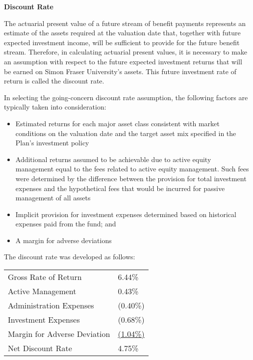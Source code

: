 \documentclass{report}
\begin{document}
\vspace{3mm}
\textbf{Discount Rate}

The actuarial present value of a future stream of benefit payments represents an estimate of the assets required at the valuation date that, together with future expected investment income, will be sufficient to provide for the future benefit stream. Therefore, in calculating actuarial present values, it is necessary to make an assumption with respect to the future expected investment returns that will be earned on Simon Fraser University's assets. This future investment rate of return is called the discount rate.

\vspace{3mm}
In selecting the going-concern discount rate assumption, the following factors are typically taken into consideration:

\begin{itemize}
\item Estimated returns for each major asset class consistent with market conditions on the valuation date and the target asset mix specified in the Plan's investment policy
\item Additional returns assumed to be achievable due to active equity management equal to the fees related to active equity management. Such fees were determined by the difference between the provision for total investment expenses and the hypothetical fees that would be incurred for passive management of all assets
\item Implicit provision for investment expenses determined based on historical expenses paid from the fund; and
\item A margin for adverse deviations
\end{itemize}

\vspace{3mm}
The discount rate was developed as follows:

\bgroup
\normalsize
\def\arraystretch{1.5}
\begin{longtable}[l]{p{8.5cm} p{6cm}}
Gross Rate of Return & \hspace{12mm} 6.44\% \\
Active Management & \hspace{12mm} 0.43\% \\
Administration Expenses & \hspace{11mm} (0.40\%) \\
Investment Expenses & \hspace{11mm} (0.68\%) \\
Margin for Adverse Deviation & \uline{\hspace{11mm} (1.04\%)} \\ 
Net Discount Rate & \hspace{12mm} 4.75\% \\
\end{longtable}
\egroup
\end{document}
